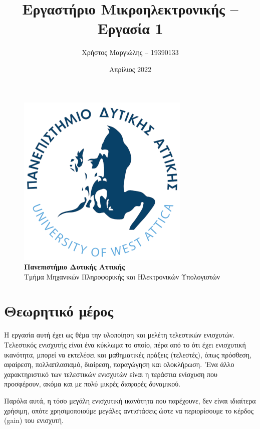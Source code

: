 \documentclass[12pt]{article}
\title{Εργαστήριο Μικροηλεκτρονικής -- Εργασία 1}
\author{Χρήστος Μαργιώλης -- 19390133}
\date{Απρίλιος 2022}
\begin{document}
\begin{titlepage}
        \maketitle
        \begin{figure}[t!]
        \begin{center}
        \includegraphics[scale=0.3]{./res/uniwalogo.png} \\
        \Large
        \textbf{Πανεπιστήμιο Δυτικής Αττικής} \\
        \large
        Τμήμα Μηχανικών Πληροφορικής και Ηλεκτρονικών Υπολογιστών
        \end{center}
        \end{figure}
\end{titlepage}

\renewcommand{\contentsname}{Περιεχόμενα}
\tableofcontents
\pagebreak

\section{Θεωρητικό μέρος}

Η εργασία αυτή έχει ως θέμα την υλοποίηση και μελέτη τελεστικών ενισχυτών.
Τελεστικός ενισχυτής είναι ένα κύκλωμα το οποίο, πέρα από το ότι έχει
ενισχυτική ικανότητα, μπορεί να εκτελέσει και μαθηματικές πράξεις (τελεστές),
όπως πρόσθεση, αφαίρεση, πολλαπλασιαμό, διαίρεση, παραγώγηση και ολοκλήρωση.
'Ενα άλλο χαρακτηριστικό των τελεστικών ενισχυτών είναι η τεράστια ενίσχυση που
προσφέρουν, ακόμα και με πολύ μικρές διαφορές δυναμικού.

Παρόλα αυτά, η τόσο μεγάλη ενισχυτική ικανότητα που παρέχουνε, δεν είναι
ιδιαίτερα χρήσιμη, οπότε χρησιμοποιούμε μεγάλες αντιστάσεις ώστε να
περιορίσουμε το κέρδος (gain) του ενισχυτή.
\end{document}
